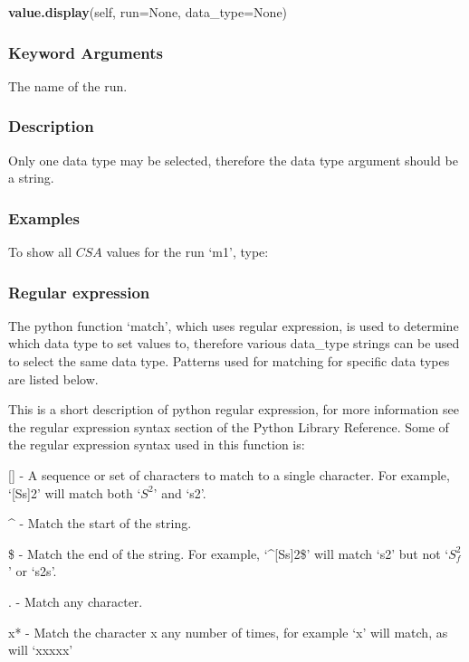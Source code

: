 \textsf{\textbf{value.display}(self, run=None, data\_type=None)}


\subsubsection{Keyword Arguments}

  The name of the run.


\subsubsection{Description}

Only one data type may be selected, therefore the data type argument should be a string.


\subsubsection{Examples}

To show all $CSA$ values for the run `m1', type:




\subsubsection{Regular expression}

The python function `match', which uses regular expression, is used to determine which data
type to set values to, therefore various data\_type strings can be used to select the same
data type.  Patterns used for matching for specific data types are listed below.

This is a short description of python regular expression, for more information see the
regular expression syntax section of the Python Library Reference.  Some of the regular
expression syntax used in this function is:

    [] - A sequence or set of characters to match to a single character.  For example,
    `[Ss]2' will match both `$S^2$' and `s2'.

    \^{} - Match the start of the string.

    \$ - Match the end of the string.  For example, `\^{}[Ss]2\$' will match `s2' but not `$S^2_f$'
    or `s2s'.

    . - Match any character.

    x* - Match the character x any number of times, for example `x' will match, as will
    `xxxxx'

